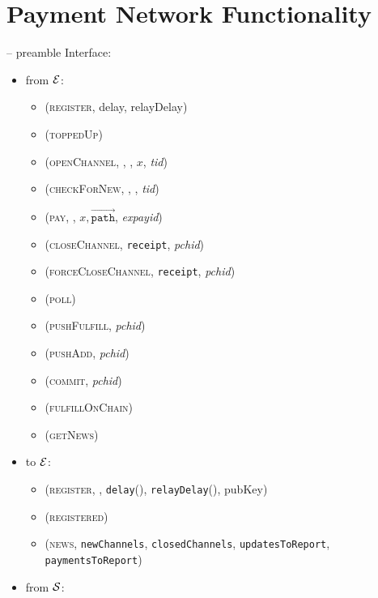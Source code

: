 \section{Payment Network Functionality}
  \label{appendix:payfunc}
  \begin{center}
    \begin{systembox}{\fpaynet{} -- preamble}
      Interface:
      \begin{itemize}
        \item from $\mathcal{E}$:
        \begin{itemize}
          \item (\textsc{register}, delay, relayDelay)
          \item (\textsc{toppedUp})
          \item (\textsc{openChannel}, \alice, \bob, $x$, \textit{tid})
          \item (\textsc{checkForNew}, \alice, \bob, \textit{tid})
          \item (\textsc{pay}, \bob, $x, \overrightarrow{\mathtt{path}}$,
          \textit{expayid})
          \item (\textsc{closeChannel}, \texttt{receipt}, \textit{pchid})
          \item (\textsc{forceCloseChannel}, \texttt{receipt}, \textit{pchid})
          \item (\textsc{poll})
          \item (\textsc{pushFulfill}, \textit{pchid})
          \item (\textsc{pushAdd}, \textit{pchid})
          \item (\textsc{commit}, \textit{pchid})
          \item (\textsc{fulfillOnChain})
          \item (\textsc{getNews})
        \end{itemize}
        \item to $\mathcal{E}$:
        \begin{itemize}
          \item (\textsc{register}, \alice, \texttt{delay}(\alice),
          \texttt{relayDelay}(\alice), pubKey)
          \item (\textsc{registered})
          \item (\textsc{news}, \texttt{newChannels},
          \texttt{closedChannels}, \texttt{updatesToReport},
          \texttt{paymentsToReport})
        \end{itemize}
        \item from $\mathcal{S}$:

\end{itemize}
\end{systembox}
\end{center}
